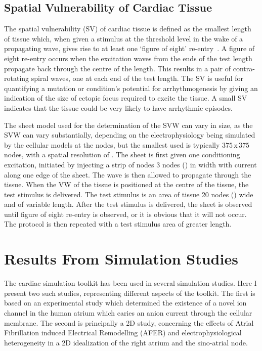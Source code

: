 \subsection{Spatial Vulnerability of Cardiac Tissue}

The spatial vulnerability (SV) of cardiac tissue is defined as the smallest
length of tissue which, when given a stimulus at the threshold level in the wake
of a propagating wave, gives rise to at least one `figure of eight'
re-entry~\cite{Zou2005}.
A figure of eight re-entry occurs when the excitation waves from the ends of the
test length propagate back through the centre of the length.
This results in a pair of contra-rotating spiral waves, one at each end of the
test length.
The SV is useful for quantifying a mutation or condition's potential for
arrhythmogenesis by giving an indication of the size of ectopic focus required
to excite the tissue.
A small SV indicates that the tissue could be very likely to have arrhythmic
episodes.

The sheet model used for the determination of the SVW can vary in size, as the
SVW can vary substantially, depending on the electrophysiology being simulated
by the cellular models at the nodes, but the smallest used is typically
$375\,\text{x}\,375$ nodes, with a spatial resolution of .  The sheet is first given one
conditioning excitation, initiated by injecting a strip of nodes 3 nodes
() in width with current along one edge of the sheet.  The wave is then
allowed to propagate through the tissue.  When the VW of the tissue is
positioned at the centre of the tissue, the test stimulus is delivered.  The
test stimulus is an area of tissue 20 nodes () wide and of variable length.
After the test stimulus is delivered, the sheet is observed until figure of
eight re-entry is observed, or it is obvious that it will not occur.  The
protocol is then repeated with a test stimulus area of greater length.


\section{Results From Simulation Studies}

The cardiac simulation toolkit has been used in several simulation studies.
Here I present two such studies, representing different aspects of the toolkit.
The first is based on an experimental study which determined the existence of a
novel ion channel in the human atrium which caries an anion current through the
cellular membrane.  The second is principally a 2D study, concerning the effects
of Atrial Fibrillation induced Electrical Remodelling (AFER) and
electrophysiological heterogeneity in a 2D idealization of the right atrium and
the sino-atrial node.

